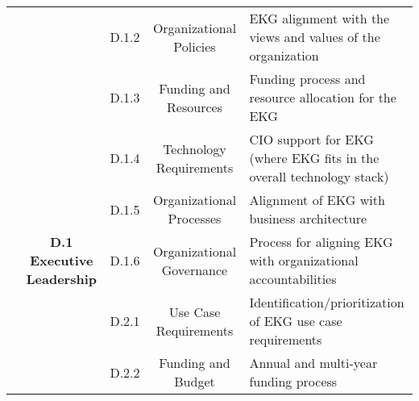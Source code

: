 \begin{table}[ht]
\begin{tabular}{@{}cclcl@{}}
    \cellcolor[HTML]{A5A5A5}{}                                            & \cellcolor[HTML]{BFBFBF}                                                           & \cellcolor[HTML]{D8D8D8}D.1.2 & \cellcolor[HTML]{D8D8D8}Organizational Policies      & \cellcolor[HTML]{F2F2F2}EKG alignment with the views and values of the organization            \\
    \cellcolor[HTML]{A5A5A5}{}                                            & \cellcolor[HTML]{BFBFBF}                                                           & \cellcolor[HTML]{D8D8D8}D.1.3 & \cellcolor[HTML]{D8D8D8}Funding and Resources        & \cellcolor[HTML]{F2F2F2}Funding process and resource allocation for the EKG                    \\
    \cellcolor[HTML]{A5A5A5}{}                                            & \cellcolor[HTML]{BFBFBF}                                                           & \cellcolor[HTML]{D8D8D8}D.1.4 & \cellcolor[HTML]{D8D8D8}Technology Requirements      & \cellcolor[HTML]{F2F2F2}CIO support for EKG (where EKG fits in the overall technology stack)   \\
    \cellcolor[HTML]{A5A5A5}{}                                            & \cellcolor[HTML]{BFBFBF}                                                           & \cellcolor[HTML]{D8D8D8}D.1.5 & \cellcolor[HTML]{D8D8D8}Organizational Processes     & \cellcolor[HTML]{F2F2F2}Alignment of EKG with business architecture                            \\
    \cellcolor[HTML]{A5A5A5}{}                                            & \multirow{-6}{*}{\cellcolor[HTML]{BFBFBF}\textbf{D.1 Executive Leadership}}        & \cellcolor[HTML]{D8D8D8}D.1.6 & \cellcolor[HTML]{D8D8D8}Organizational Governance    & \cellcolor[HTML]{F2F2F2}Process for aligning EKG with organizational accountabilities          \\
    \cellcolor[HTML]{A5A5A5}{}                                            & \cellcolor[HTML]{BFBFBF}                                                           & \cellcolor[HTML]{D8D8D8}D.2.1 & \cellcolor[HTML]{D8D8D8}Use Case Requirements        & \cellcolor[HTML]{F2F2F2}Identification/prioritization of EKG use case requirements             \\
    \cellcolor[HTML]{A5A5A5}{}                                            & \cellcolor[HTML]{BFBFBF}                                                           & \cellcolor[HTML]{D8D8D8}D.2.2 & \cellcolor[HTML]{D8D8D8}Funding and Budget           & \cellcolor[HTML]{F2F2F2}Annual and multi-year funding process                                  \\

\end{tabular}
\end{table}
